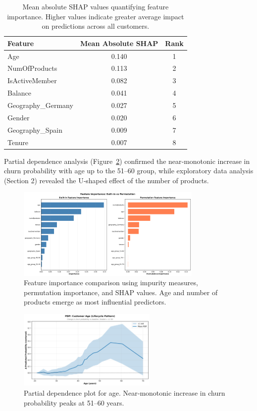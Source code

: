 \documentclass[12pt]{article}
\begin{document}
\begin{table}[H]
\centering
\small
\caption{Mean absolute SHAP values quantifying feature importance. Higher values indicate greater average impact on predictions across all customers.}
\label{tab:shap_importance}
\begin{tabular}{lcc}
\toprule
\textbf{Feature} & \textbf{Mean Absolute SHAP} & \textbf{Rank} \\
\midrule
Age & 0.140 & 1 \\
NumOfProducts & 0.113 & 2 \\
IsActiveMember & 0.082 & 3 \\
Balance & 0.041 & 4 \\
Geography\_Germany & 0.027 & 5 \\
Gender & 0.020 & 6 \\
Geography\_Spain & 0.009 & 7 \\
Tenure & 0.007 & 8 \\
\bottomrule
\end{tabular}
\end{table}

Partial dependence analysis (Figure~\ref{fig:pdp_age}) confirmed the near‑monotonic increase in churn probability with age up to the 51–60 group, while exploratory data analysis (Section 2) revealed the U‑shaped effect of the number of products.

\begin{figure}[H]
\centering
\includegraphics[width=0.8\textwidth]{img/15_feature_importance_comparison.png}
\caption{Feature importance comparison using impurity measures, permutation importance, and SHAP values. Age and number of products emerge as most influential predictors.}
\label{fig:feature_importance}
\end{figure}

\begin{figure}[H]
\centering
\includegraphics[width=0.6\textwidth]{img/18_pdp_age.png}
\caption{Partial dependence plot for age. Near‑monotonic increase in churn probability peaks at 51–60 years.}
\label{fig:pdp_age}
\end{figure}
\end{document}
